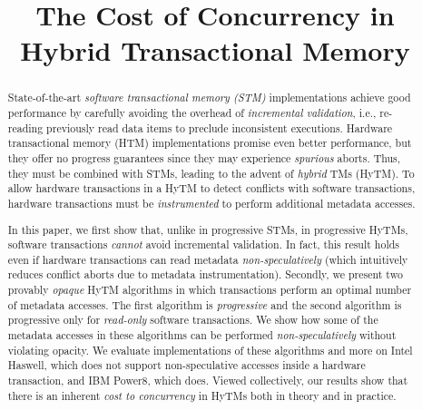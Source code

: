\documentclass[nocopyrightspace,numbers,10pt,preprint]{sigplanconf}
\begin{document}
\title{The Cost of Concurrency in Hybrid Transactional Memory}
\authorinfo{}{}

\maketitle

\newcommand{\trevor}[1]{\textbf{[[#1--Trevor]]}}

%
\begin{abstract}
State-of-the-art \emph{software transactional memory (STM)} implementations achieve good performance by carefully avoiding the overhead of \emph{incremental validation}, i.e., re-reading previously read data items to preclude inconsistent executions.
Hardware transactional memory (HTM) implementations promise even better performance, but they offer no progress guarantees since they may experience %
\emph{spurious} aborts.
Thus, they must be combined with STMs, leading to the advent of \emph{hybrid} TMs (HyTM).
To allow hardware transactions in a HyTM to detect conflicts with software transactions, hardware transactions must be \emph{instrumented} to perform additional metadata accesses. 

In this paper, we first show that, unlike in progressive STMs, in progressive HyTMs, software transactions \textit{cannot} avoid incremental validation.
In fact, this result holds even if hardware transactions can read metadata \emph{non-speculatively} (which intuitively reduces conflict aborts due to metadata instrumentation).
%
Secondly, we present two provably \emph{opaque} HyTM algorithms in which transactions %
perform an optimal number of metadata accesses.
The first algorithm is \emph{progressive} and the second algorithm is progressive only for \emph{read-only} software transactions.
We show how some of the metadata accesses in these algorithms can be performed \textit{non-speculatively} without violating opacity.
%
We evaluate implementations of these algorithms and more on Intel Haswell, which does not support non-speculative accesses inside a hardware transaction, and IBM Power8, which does.
Viewed collectively, our results show that there is an inherent \emph{cost to concurrency} in HyTMs both in theory and in practice.
\end{abstract}

{}\setcounter{page}{1}


%

%

%

%

%

%

%

%

%
\newpage
%


\end{document}
